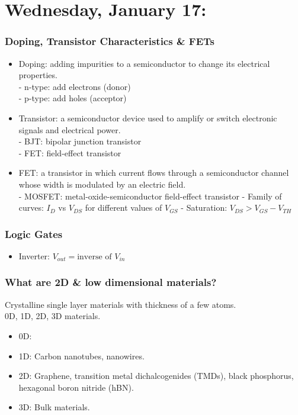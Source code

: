 \documentclass[10pt, oneside]{article}
\begin{document}
\maketitle
\tableofcontents

\vspace{.25in}


\section{Wednesday, January 17: }

\subsubsection{Doping, Transistor Characteristics \& FETs}
\begin{itemize}
\item Doping: adding impurities to a semiconductor to change its electrical properties.\\
    - n-type: add electrons (donor)\\
    - p-type: add holes (acceptor)
\item Transistor: a semiconductor device used to amplify or switch electronic signals and electrical power.\\
    - BJT: bipolar junction transistor\\
    - FET: field-effect transistor
\item FET: a transistor in which current flows through a semiconductor channel whose width is modulated by an electric field.\\
    - MOSFET: metal-oxide-semiconductor field-effect transistor
    - Family of curves: $I_D$ vs $V_{DS}$ for different values of $V_{GS}$
    - Saturation: $V_{DS} > V_{GS} - V_{TH}$

\end{itemize}

\subsubsection{Logic Gates}
\begin{itemize}
\item Inverter: $V_{out} =  \text{inverse of } V_{in}$
\end{itemize}

\subsubsection{What are 2D \& low dimensional materials?}

Crystalline single layer materials with thickness of a few atoms.\\
0D, 1D, 2D, 3D materials.
\begin{itemize}
\item 0D: 
\item 1D: Carbon nanotubes, nanowires.
\item 2D: Graphene, transition metal dichalcogenides (TMDs), black phosphorus, hexagonal boron nitride (hBN).
\item 3D: Bulk materials.
\end{itemize}
\end{document}
